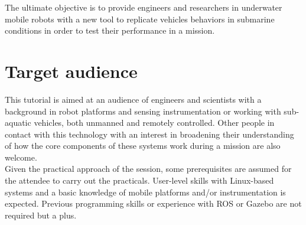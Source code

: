 \documentclass[
10pt, %
a4paper, %
oneside, %
BCOR5mm, %
]{scrartcl}
\begin{document}
The ultimate objective is to provide engineers and researchers in underwater mobile robots with a new tool to replicate vehicles behaviors in submarine conditions in order to test their performance in a mission. 
\\


\section{Target audience}
\label{sec:audience}
This tutorial is aimed at an audience of engineers and scientists with a background in robot platforms and sensing instrumentation or working with sub-aquatic vehicles, both unmanned and remotely controlled.
Other people in contact with this technology with an interest in broadening their understanding of how the core components of these systems work during a mission are also welcome.
\\
Given the practical approach of the session, some prerequisites are assumed for the attendee to carry out the practicals.
User-level skills with Linux-based systems and a basic knowledge of mobile platforms and/or instrumentation is expected.
Previous programming skills or experience with ROS or Gazebo are not required but a plus.

\end{document}

